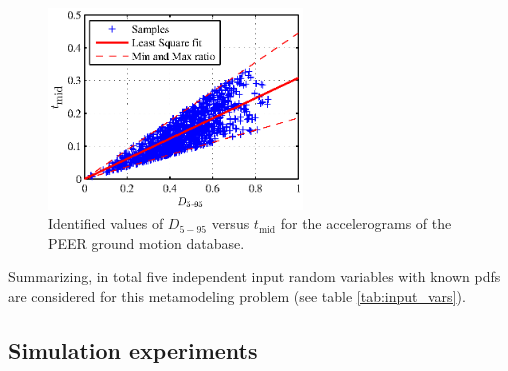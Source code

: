 \documentclass[12pt,a4paper,twocolumn,fleqn]{narms}
\begin{document}
\begin{figure}
\centering\includegraphics[width=6.75cm]{figs/D545_D595.eps}
\caption{Identified values of $D_{5-95}$ versus $t_{\text{mid}}$ for the accelerograms of the PEER ground motion database.}\label{fig:D545_D595}
\end{figure}


Summarizing, in total five independent input random variables with known pdfs are considered for this metamodeling problem (see table \ref{tab:input_vars}). 

\begin{table}
\caption{Random input variables.}\label{tab:input_vars}
\end{table}



\subsection{Simulation experiments}
\end{document}
